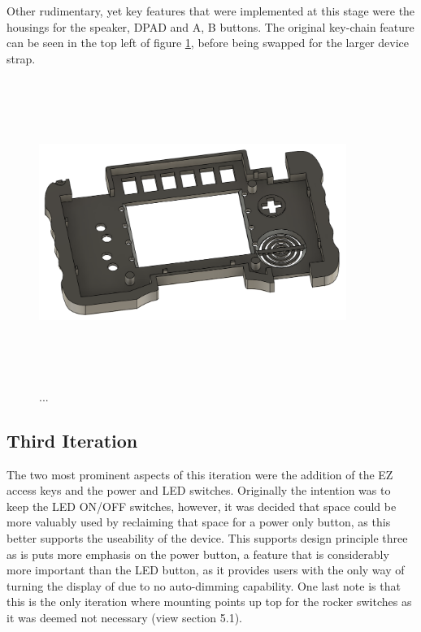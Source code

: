 Other rudimentary, yet key features that were implemented at this stage were the housings for the speaker, DPAD and A, B buttons.
The original key-chain feature can be seen in the top left of figure \ref{fig:iteration2_t_b}, before being swapped for the larger device strap.

\begin{figure} [h]
    \centering
    \includegraphics[width=10cm,height=10cm,keepaspectratio]{Figures/iteration2_top_back.png}
    \caption{...}
    \label{fig:iteration2_t_b}
\end{figure}

\subsection{Third Iteration}

The two most prominent aspects of this iteration were the addition of the EZ access keys and the power and LED switches.
Originally the intention was to keep the LED ON/OFF switches, however, it was decided that space could be more valuably used by reclaiming that space for a power only button, as this better supports the useability of the device.
This supports design principle three as is puts more emphasis on the power button, a feature that is considerably more important than the LED button, as it provides users with the only way of turning the display of due to no auto-dimming capability.
One last note is that this is the only iteration where mounting points up top for the rocker switches as it was deemed not necessary (view section 5.1).

